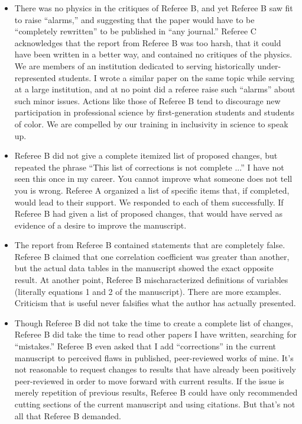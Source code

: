 \documentclass[12pt]{article}
\begin{document}
\begin{itemize}
\item There was no physics in the critiques of Referee B, and yet Referee B saw fit to raise ``alarms,'' and suggesting that the paper would have to be ``completely rewritten'' to be published in ``any journal.''  Referee C acknowledges that the report from Referee B was too harsh, that it could have been written in a better way, and contained no critiques of the physics.  We are members of an institution dedicated to serving historically under-represented students.  I wrote a similar paper on the same topic while serving at a large institution, and at no point did a referee raise such ``alarms'' about such minor issues.  Actions like those of Referee B tend to discourage new participation in professional science by first-generation students and students of color.  We are compelled by our training in inclusivity in science to speak up.
\item Referee B did not give a complete itemized list of proposed changes, but repeated the phrase ``This list of corrections is not complete ...'' I have not seen this once in my career.  You cannot improve what someone does not tell you is wrong.  Referee A organized a list of specific items that, if completed, would lead to their support.  We responded to each of them successfully.  If Referee B had given a list of proposed changes, that would have served as evidence of a desire to improve the manuscript.
\item The report from Referee B contained statements that are completely false.  Referee B claimed that one correlation coefficient was greater than another, but the actual data tables in the manuscript showed the exact opposite result.  At another point, Referee B mischaracterized definitions of variables (literally equations 1 and 2 of the manuscript).  There are more examples.  Criticism that is useful never falsifies what the author has actually presented.
\item Though Referee B did not take the time to create a complete list of changes, Referee B did take the time to read other papers I have written, searching for ``mistakes.''  Referee B even asked that I add ``corrections'' in the current manuscript to perceived flaws in published, peer-reviewed works of mine.  It's not reasonable to request changes to results that have already been positively peer-reviewed in order to move forward with current results.  If the issue is merely repetition of previous results, Referee B could have only recommended cutting sections of the current manuscript and using citations.  But that's not all that Referee B demanded.
\end{itemize}
\end{document}
